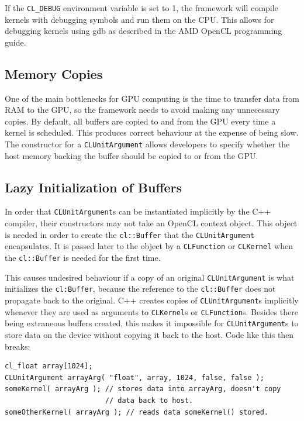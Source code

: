\documentclass{article}
\begin{document}
If the \texttt{CL\_DEBUG} environment variable is set to 1, the framework will compile kernels with debugging symbols and run them on the CPU. This allows for debugging kernels using gdb as described in the AMD OpenCL programming guide\cite{amdapp}.

\subsection{Memory Copies}
One of the main bottlenecks for GPU computing is the time to transfer data from RAM to the GPU, so the framework needs to avoid making any unnecessary copies. By default, all buffers are copied to and from the GPU every time a kernel is scheduled. This produces correct behaviour at the expense of being slow. The constructor for a \texttt{CLUnitArgument} allows developers to specify whether the host memory backing the buffer should be copied to or from the GPU.

\subsection{Lazy Initialization of Buffers}
In order that \texttt{CLUnitArgument}s can be instantiated implicitly by the C++ compiler, their constructors may not take an OpenCL context object. This object is needed in order to create the \texttt{cl::Buffer} that the \texttt{CLUnitArgument} encapsulates. It is passed later to the object by a \texttt{CLFunction} or \texttt{CLKernel} when the \texttt{cl::Buffer} is needed for the first time.

This causes undesired behaviour if a copy of an original \texttt{CLUnitArgument} is what initializes the \texttt{cl:Buffer}, because the reference to the \texttt{cl::Buffer} does not propagate back to the original. C++ creates copies of \texttt{CLUnitArgument}s implicitly whenever they are used as arguments to \texttt{CLKernel}s or \texttt{CLFunction}s. Besides there being extraneous buffers created, this makes it impossible for \texttt{CLUnitArgument}s to store data on the device without copying it back to the host. Code like this then breaks:

\begin{lstlisting}
cl_float array[1024];
CLUnitArgument arrayArg( "float", array, 1024, false, false );
someKernel( arrayArg ); // stores data into arrayArg, doesn't copy
                        // data back to host.
someOtherKernel( arrayArg ); // reads data someKernel() stored.
\end{lstlisting}
\end{document}
